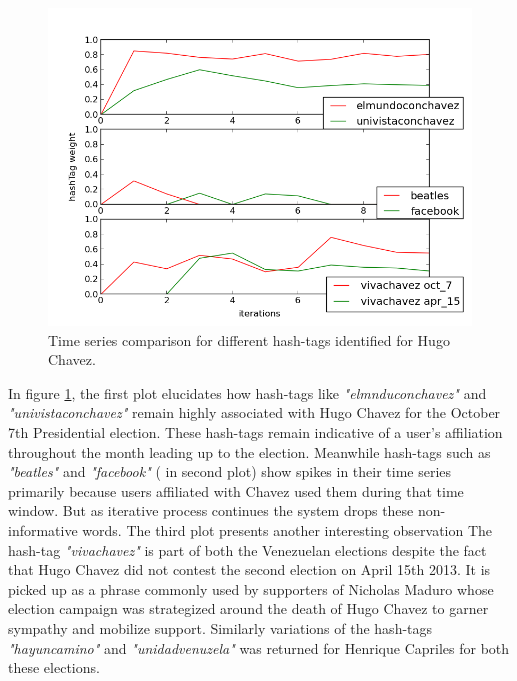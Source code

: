 \begin{figure}[Ht]
	\centering
	\includegraphics[scale=0.65]{support_files/hashTagTimeSeries.png}
	\caption{Time series comparison for different hash-tags identified for Hugo Chavez.}
	\label{fig:timeSeries}
\end{figure}
In figure \ref{fig:timeSeries}, the first plot elucidates how hash-tags like \emph{"elmnduconchavez"} and \emph{"univistaconchavez"} remain highly associated with Hugo Chavez for the October 7th Presidential election. 
These hash-tags remain indicative of a user's affiliation throughout the month leading up to the election.
Meanwhile hash-tags such as \emph{"beatles"} and \emph{"facebook"} ( in second plot) show spikes in their time series primarily because users affiliated with Chavez used them during that time window. 
But as iterative process continues the system drops these non-informative words.
The third plot presents another interesting observation 
The hash-tag \emph{"vivachavez"} is part of both the Venezuelan elections despite the fact that Hugo Chavez did not contest the second election on April 15th 2013. 
It is picked up as a phrase commonly used by supporters of Nicholas Maduro whose election campaign was strategized around the death of Hugo Chavez to garner sympathy and mobilize support.
Similarly variations of the hash-tags \emph{"hayuncamino"} and \emph{"unidadvenuzela"} was returned for Henrique Capriles for both these elections.
